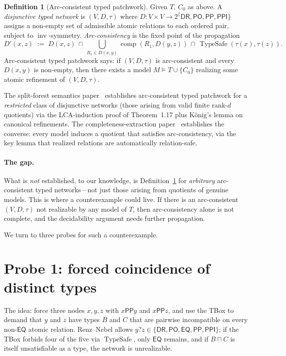\documentclass[11pt]{article}
\theoremstyle{definition}
\newtheorem{definition}[theorem]{Definition}
\theoremstyle{remark}
\newcommand{\DR}{\mathsf{DR}}
\newcommand{\PO}{\mathsf{PO}}
\newcommand{\PP}{\mathsf{PP}}
\newcommand{\PPI}{\mathsf{PPI}}
\newcommand{\EQ}{\mathsf{EQ}}
\newcommand{\RCC}{\{\DR,\PO,\PP,\PPI\}}
\newcommand{\comp}{\operatorname{comp}}
\newcommand{\inv}{\operatorname{inv}}
\newcommand{\TypeSafe}{\operatorname{TypeSafe}}
\begin{document}
\begin{definition}[Arc-consistent typed patchwork]
\label{def:ac-pw}
Given $T$, $C_0$ as above.  A \emph{disjunctive typed network} is
$(V, D, \tau)$ where $D: V \times V \to 2^\RCC$ assigns a non-empty
set of admissible atomic relations to each ordered pair, subject
to $\inv$-symmetry.  \emph{Arc-consistency} is the fixed point of
the propagation
\[
  D'(x, z) \;:=\; D(x, z) \,\cap\,
  \bigcup_{R_1 \in D(x,y)} \comp(R_1, D(y, z))
  \,\cap\, \TypeSafe(\tau(x), \tau(z)).
\]
Arc-consistent typed patchwork says: if $(V, D, \tau)$ is
arc-consistent and every $D(x,y)$ is non-empty, then there exists
a model $M \models T \cup \{C_0\}$ realizing some atomic
refinement of $(V, D, \tau)$.
\end{definition}

The split-forest semantics paper~\cite{SplitForest} establishes
arc-consistent typed patchwork for a \emph{restricted} class of
disjunctive networks (those arising from valid finite rank-$d$
quotients) via the LCA-induction proof of Theorem~1.17 plus
König's lemma on canonical refinements.  The completeness-extraction
paper~\cite{CompletenessExtraction} establishes the converse: every
model induces a quotient that satisfies arc-consistency, via the key
lemma that realized relations are automatically relation-safe.

\paragraph{The gap.}  What is \emph{not} established, to our
knowledge, is Definition~\ref{def:ac-pw} for \emph{arbitrary}
arc-consistent typed networks---not just those arising from quotients
of genuine models.  This is where a counterexample could live.  If
there is an arc-consistent $(V, D, \tau)$ not realizable by any
model of $T$, then arc-consistency alone is not complete, and the
decidability argument needs further propagation.

We turn to three probes for such a counterexample.

\section{Probe 1: forced coincidence of distinct types}
\label{sec:probe1}

The idea: force three nodes $x, y, z$ with $x \PP y$ and
$x \PP z$, and use the TBox to demand that $y$ and $z$ have types
$B$ and $C$ that are pairwise incompatible on every non-$\EQ$
atomic relation.  Renz--Nebel allows $y ? z \in \{\DR, \PO, \EQ,
\PP, \PPI\}$; if the TBox forbids four of the five via
$\TypeSafe$, only $\EQ$ remains, and if $B \sqcap C$ is itself
unsatisfiable as a type, the network is unrealizable.
\end{document}
